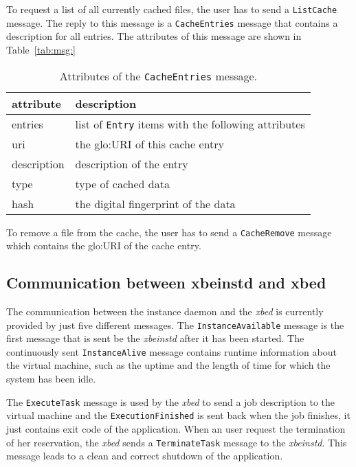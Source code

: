 To request a  list of all currently  cached files, the user has  to send a
\texttt{ListCache}   message.    The   reply   to  this   message   is   a
\texttt{CacheEntries} message that contains a description for all entries.
The attributes of this message are shown in Table~\ref{tab:msg:}

\begin{table}[ht]
  \centering
  \begin{tabular}{@{}lp{}@{}}\toprule
    attribute        & \multicolumn{1}{l}{description} \\ \midrule %
    entries          & list of \texttt{Entry} items with the following attributes \\
    uri              & the \gls{glo:URI} of this cache entry \\
    description      & description of the entry \\
    type             & type of cached data \\
    hash             & the digital fingerprint of the data \\
    \bottomrule
  \end{tabular}
  \caption{Attributes of the \texttt{CacheEntries} message.}
  \label{tab:msg:cache-entries}
\end{table}

To   remove  a   file  from   the   cache,  the   user  has   to  send   a
\texttt{CacheRemove} message which contains the \gls{glo:URI} of the cache
entry.
 
\subsection{Communication between xbeinstd and xbed}

The  communication between  the  instance daemon  and  the \emph{xbed}  is
currently    provided   by    just   five    different    messages.    The
\texttt{InstanceAvailable} message  is the first  message that is  sent be
the  \emph{xbeinstd} after  it has  been started.   The  continuously sent
\texttt{InstanceAlive}  message  contains  runtime information  about  the
virtual machine, such  as the uptime and the length of  time for which the
system has been idle.

The \texttt{ExecuteTask} message is used  by the \emph{xbed} to send a job
description to  the virtual machine and  the \texttt{ExecutionFinished} is
sent  back when  the  job finishes,  it  just contains  exit  code of  the
application. When an user request  the termination of her reservation, the
\emph{xbed}    sends    a    \texttt{TerminateTask}   message    to    the
\emph{xbeinstd}. This message leads to a clean and correct shutdown of the
application.


